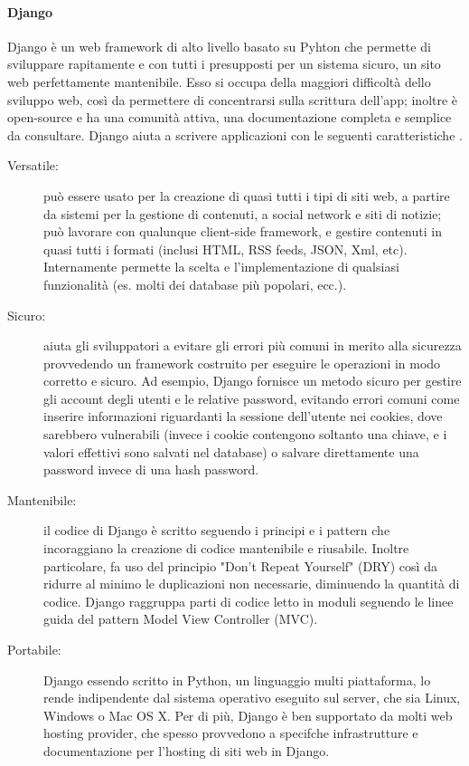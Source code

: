 \paragraph{Django}
Django è un web framework di alto livello basato su Pyhton che permette di sviluppare rapitamente e con tutti i presupposti per un sistema sicuro, un sito web
perfettamente mantenibile. Esso si occupa della maggiori difficoltà dello sviluppo web, così da permettere di concentrarsi sulla scrittura dell'app; inoltre 
è open-source e ha una comunità attiva, una documentazione completa e semplice da consultare.\hfill\break
Django aiuta a scrivere applicazioni con le seguenti caratteristiche \cite{django-documentation}.
\begin{description}
    \item[Versatile:] può essere usato per la creazione di quasi tutti i tipi di siti web, a partire da sistemi per la gestione di contenuti,
    a social network e siti di notizie; può lavorare con qualunque client-side framework, e gestire contenuti in quasi tutti i formati (inclusi HTML, 
    RSS feeds, JSON, Xml, etc). Internamente permette la scelta e l'implementazione di qualsiasi funzionalità (es. molti dei database più popolari, ecc.).
    \item[Sicuro:] aiuta gli sviluppatori a evitare gli errori più comuni in merito alla sicurezza provvedendo un framework costruito per eseguire 
    le operazioni in modo corretto e sicuro. Ad esempio, Django fornisce un metodo sicuro per gestire gli account degli utenti e le relative 
    password, evitando errori comuni come inserire informazioni riguardanti la sessione dell'utente nei cookies, dove sarebbero vulnerabili (invece i cookie 
    contengono soltanto una chiave, e i valori effettivi sono salvati nel database) o salvare direttamente una password invece di una hash password.
    \item[Mantenibile:] il codice di Django è scritto seguendo i principi e i pattern che incoraggiano la creazione di codice mantenibile e riusabile. Inoltre 
    particolare, fa uso del principio "Don't Repeat Yourself" (DRY) così da ridurre al minimo le duplicazioni non necessarie, diminuendo la quantità di codice.
    Django raggruppa parti di codice letto in moduli seguendo le linee guida del pattern Model View Controller (MVC).
    \item[Portabile:] Django essendo scritto in Python, un linguaggio multi piattaforma, lo rende indipendente dal sistema operativo eseguito sul server, che 
    sia Linux, Windows o Mac OS X. Per di più, Django è ben supportato da molti web hosting provider, che spesso provvedono a specifche infrastrutture
    e documentazione per l'hosting di siti web in Django.
\end{description}
